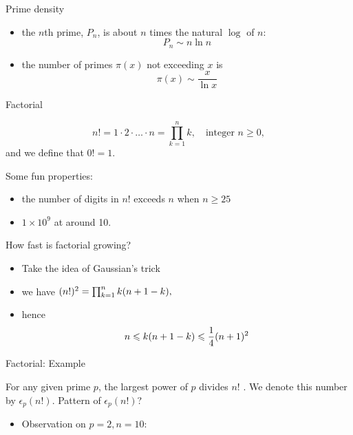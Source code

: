 \begin{frame}{Prime density}

\begin{itemize}
    \item the $n$th prime, $P_n$, is about $n$ times the natural $\log$ of $n$: $$P_n \sim n \ln n$$
    \item the number of primes $\pi(x)$ not exceeding $x$ is $$\pi(x) \sim\frac{x}{\ln x}$$
    
\end{itemize}
    
\end{frame}

\begin{frame}{Factorial}
    \begin{definition}[Factorial]
        $$n !=1 \cdot 2 \cdot \ldots \cdot n=\prod_{k=1}^n k, \quad \text{integer } n \geqslant 0,$$ and we define that $0!=1$. 
    \end{definition}

    Some fun properties: 
    \begin{itemize}
        \item the number of digits in $n!$ exceeds $n$ when $n\geq  25$
        \item $1\times 10^9$ at around 10. 
    \end{itemize}
    
    How fast is factorial growing? 
    \begin{itemize}
        \item Take the idea of Gaussian's trick
        \item we have $\small( n !)^2=\prod_{k=1}^n k(n+1-k),$
        \item hence $$\small n \leqslant k(n+1-k) \leqslant \frac{1}{4}(n+1)^2$$

    \end{itemize}
\end{frame}

\begin{frame}{Factorial: Example}

\begin{example}
    For any given prime $p$, the largest power of $p$ divides $n!$ . We denote this number by $\epsilon_p(n !)$. Pattern of $\epsilon_p(n !)$?
\end{example}

\begin{itemize}
    \item Observation on $p=2, n=10$:
\end{itemize}


    
\end{frame}